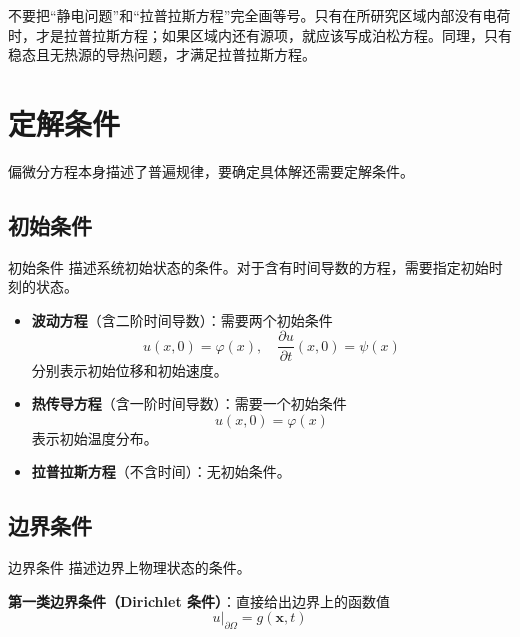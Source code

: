 \begin{jinshi}
不要把``静电问题''和``拉普拉斯方程''完全画等号。只有在所研究区域内部没有电荷时，才是拉普拉斯方程；如果区域内还有源项，就应该写成泊松方程。同理，只有稳态且无热源的导热问题，才满足拉普拉斯方程。
\end{jinshi}

\section{定解条件}

偏微分方程本身描述了普遍规律，要确定具体解还需要定解条件。

\subsection{初始条件}

\begin{dingliyi}{初始条件}{}
描述系统初始状态的条件。对于含有时间导数的方程，需要指定初始时刻的状态。
\end{dingliyi}

\begin{itemize}
    \item \textbf{波动方程}（含二阶时间导数）：需要两个初始条件
    \begin{equation}
        u(x, 0) = \varphi(x), \quad \frac{\partial u}{\partial t}(x, 0) = \psi(x)
    \end{equation}
    分别表示初始位移和初始速度。
    
    \item \textbf{热传导方程}（含一阶时间导数）：需要一个初始条件
    \begin{equation}
        u(x, 0) = \varphi(x)
    \end{equation}
    表示初始温度分布。
    
    \item \textbf{拉普拉斯方程}（不含时间）：无初始条件。
\end{itemize}

\subsection{边界条件}

\begin{dingliyi}{边界条件}{}
描述边界上物理状态的条件。
\end{dingliyi}

\textbf{第一类边界条件（Dirichlet 条件）}：直接给出边界上的函数值
\begin{equation}
    u|_{\partial\Omega} = g(\boldsymbol{x}, t)
\end{equation}

